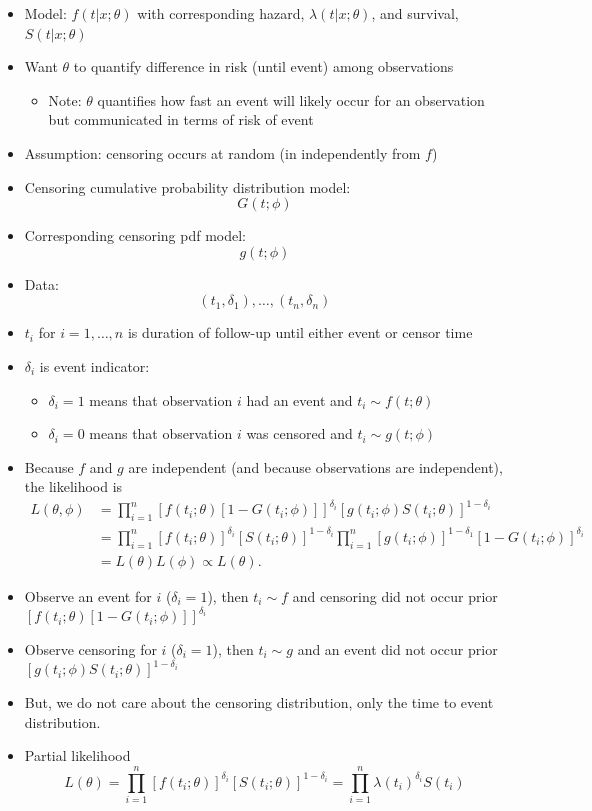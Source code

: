 \documentclass[
]{article}
\providecommand{\tightlist}{%
  \setlength{\itemsep}{0pt}\setlength{\parskip}{0pt}}
\begin{document}
\begin{itemize}
\item
  Model: \(f(t|x; \theta)\) with corresponding hazard,
  \(\lambda(t|x;\theta)\), and survival, \(S(t|x;\theta)\)
\item
  Want \(\theta\) to quantify difference in risk (until event) among
  observations

  \begin{itemize}
  \tightlist
  \item
    Note: \(\theta\) quantifies how fast an event will likely occur for
    an observation but communicated in terms of risk of event
  \end{itemize}
\item
  Assumption: censoring occurs at random (in independently from \(f\))
\item
  Censoring cumulative probability distribution model: \[G(t;\phi)\]
\item
  Corresponding censoring pdf model: \[g(t;\phi)\]
\item
  Data: \[(t_1, \delta_1),\dots, (t_n,\delta_n)\]
\item
  \(t_i\) for \(i=1,\dots,n\) is duration of follow-up until either
  event or censor time
\item
  \(\delta_i\) is event indicator:

  \begin{itemize}
  \tightlist
  \item
    \(\delta_i=1\) means that observation \(i\) had an event and
    \(t_i \sim f(t;\theta)\)
  \item
    \(\delta_i=0\) means that observation \(i\) was censored and
    \(t_i \sim g(t;\phi)\)
  \end{itemize}
\item
  Because \(f\) and \(g\) are independent (and because observations are
  independent), the likelihood is \[
  \begin{align}
  L(\theta,\phi) &= \prod_{i=1}^n [f(t_i;\theta)[1-G(t_i;\phi)]]^{\delta_i} [g(t_i;\phi)S(t_i;\theta)]^{1-\delta_i}\\
  &=  \prod_{i=1}^n [f(t_i;\theta)]^{\delta_i}[S(t_i;\theta)]^{1-\delta_i} \prod_{i=1}^n [g(t_i;\phi)]^{1-\delta_1}[1-G(t_i;\phi)]^{\delta_i}\\
  &= L(\theta) L(\phi) \propto L(\theta).
  \end{align}
  \]
\item
  Observe an event for \(i\) (\(\delta_i=1\)), then \(t_i\sim f\) and
  censoring did not occur prior
  \([f(t_i;\theta)[1-G(t_i;\phi)]]^{\delta_i}\)
\item
  Observe censoring for \(i\) (\(\delta_i=1\)), then \(t_i\sim g\) and
  an event did not occur prior
  \([g(t_i;\phi)S(t_i;\theta)]^{1-\delta_i}\)
\item
  But, we do not care about the censoring distribution, only the time to
  event distribution.
\item
  Partial likelihood
  \[L(\theta)=\prod_{i=1}^n [f(t_i;\theta)]^{\delta_i}[S(t_i;\theta)]^{1-\delta_i}= \prod_{i=1}^n \lambda(t_i)^{\delta_i} S(t_i)\]
\end{itemize}
\end{document}
